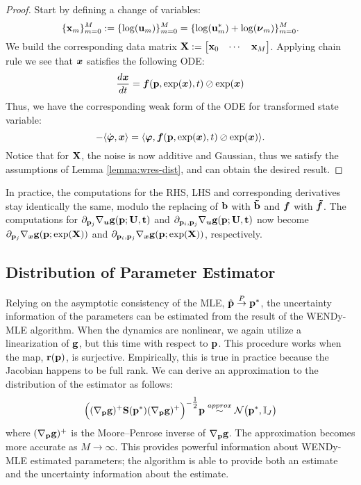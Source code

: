 \begin{proof}
	Start by defining a change of variables:
	\[\{\mathbf{x}_m\}_{m=0}^M := \{\log(\mathbf{u}_m)\}_{m=0}^M = \{\log(\mathbf{u}^*_m) + \log(\boldsymbol{\nu}_m)\}_{m=0}^M.\]
	We build the corresponding data matrix \(\mathbf{X} := \begin{bmatrix}
		\mathbf{x}_0 & \cdots & \mathbf{x}_M
	\end{bmatrix}\).
	Applying chain rule we see that $\boldsymbol{x}$ satisfies the following ODE:
	\[\frac{d\boldsymbol{x}}{dt} = \boldsymbol{f}(\mathbf{p}, \exp(\boldsymbol{x}), t) \oslash \exp(\boldsymbol{x}) \]
	Thus, we have the corresponding weak form of the ODE for transformed state variable:
	\[ -\langle \dot{\boldsymbol{\varphi}}, \boldsymbol{x} \rangle = \langle \boldsymbol{\varphi} , \boldsymbol{f}(\mathbf{p}, \exp(\boldsymbol{x}), t) \oslash \exp(\boldsymbol{x})\rangle. \]
	Notice that for $\mathbf{X}$, the noise is now additive and Gaussian, thus we satisfy the assumptions of Lemma \ref{lemma:wres-dist}, and can obtain the desired result.
\end{proof}
\begin{remark}
	In practice, the computations for the RHS, LHS and corresponding derivatives stay identically the same, modulo the replacing of $\mathbf{b}$ with $\mathbf{\tilde{b}}$ and $\boldsymbol{f}$ with $\boldsymbol{\tilde{f}}$. The computations for $\partial_{\mathbf{p}_j} \nabla_{\boldsymbol{u}}  \mathbf{g}(\mathbf{p};\mathbf{U},\mathbf{t})$ and $\partial_{\mathbf{p}_i,\mathbf{p}_j}\nabla_{\boldsymbol{u}}  \mathbf{g}(\mathbf{p};\mathbf{U},\mathbf{t})$ now become $\partial_{\mathbf{p}_j} \nabla_{\boldsymbol{x}}\mathbf{g}(\mathbf{p};\exp(\mathbf{X}))$ and  $\partial_{\mathbf{p}_i,\mathbf{p}_j}\nabla_{\boldsymbol{x}} \mathbf{g}(\mathbf{p};\exp(\mathbf{X}))$, respectively.
\end{remark}
\subsection{Distribution of Parameter Estimator}
Relying on the asymptotic consistency of the MLE, $\hat{\mathbf{p}} \stackrel{P}{\rightarrow} \mathbf{p}^*$, the uncertainty information of the parameters can be estimated from the result of the WENDy-MLE algorithm. When the dynamics are nonlinear, we again utilize a linearization of $\mathbf{g}$, but this time with respect to $\mathbf{p}$. This procedure works when the map, $\mathbf{r}(\mathbf{p})$, is surjective. Empirically, this is true in practice because the Jacobian happens to be full rank. We can derive an approximation to the distribution of the estimator as follows:
\begin{equation} \label{eq:param-dist}
    \Bigl((\nabla_{\mathbf{p}} \mathbf{g})^{+}\mathbf{S}(\mathbf{p}^*)(\nabla_{\mathbf{p}} \mathbf{g})^{+}\Bigr)^{-\tfrac{1}{2}}\mathbf{p} \stackrel{approx}{\sim} \mathcal{N}\bigl(\mathbf{p}^*, \mathbb{I}_{J} \bigr) 
\end{equation}
where \((\nabla_{\mathbf{p}} \mathbf{g})^{+}\) is the Moore–Penrose inverse of \(\nabla_{\mathbf{p}} \mathbf{g}\). 
The approximation becomes more accurate as $M \rightarrow \infty$. This provides powerful information about WENDy-MLE estimated parameters;  the algorithm is able to provide both an estimate and the uncertainty information about the estimate. 

